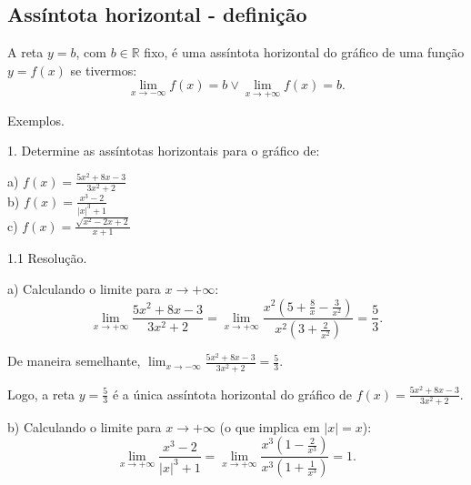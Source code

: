 \documentclass{article}
\begin{document}
{\begin{newpage}
\subsection{Assíntota horizontal - definição}
\par\hspace{12pt} A reta $y=b$, com $b\in\mathbb{R}$ fixo, é uma assíntota horizontal do gráfico de uma função $y=f(x)$ se tivermos:
$$\displaystyle{\lim_{x\to -\infty }} f(x) = b  \vee \displaystyle{\lim_{x\to +\infty }} f(x) = b .$$
\par
\vspace{0.3cm}
Exemplos.
\begin{flushleft}
1. Determine as assíntotas horizontais para o gráfico de:
\end{flushleft}
\par
\begin{multicols}{3}
\hspace{-15pt}a) $\displaystyle{f(x)=\frac{5x^2 + 8x - 3}{3x^2 + 2}}$\\
b) $\displaystyle{f(x)=\frac{x^3 -2}{|x|^3 + 1}}$\\
c) $\displaystyle{f(x)=\frac{\sqrt{x^2 - 2x + 2}}{x+1}}$
\end{multicols}
\par
\vspace{0.3cm}
\begin{flushleft}
1.1 Resolução.
\end{flushleft}
\par
a) Calculando o limite para $x\rightarrow +\infty $:
\begin{equation*} \displaystyle{\lim_{x\to +\infty }} \frac{5x^2 + 8x - 3}{3x^2 + 2} = \displaystyle{\lim_{x\to +\infty }} \frac{x^{2}(5 + \frac{8}{x} - \frac{3}{x^2})}{x^{2}(3 + \frac{2}{x^2})} = \frac{5}{3}. \end{equation*}
\par De maneira semelhante, $\displaystyle{\lim_{x\to -\infty } \frac{5x^2 + 8x - 3}{3x^2 + 2} = \frac{5}{3}}$.
\par Logo, a reta $\displaystyle{y=\frac{5}{3}}$ é a única assíntota horizontal do gráfico de $\displaystyle{f(x)= \frac{5x^2 + 8x - 3}{3x^2 + 2}}$.
\par
\vspace{0.3cm}
b) Calculando o limite para $x\rightarrow +\infty $ (o que implica em $|x|=x$):
\begin{equation*} \displaystyle{\lim_{x\to +\infty }} \frac{x^3 -2}{|x|^3 + 1} = \displaystyle{\lim_{x\to +\infty }} \frac{x^3(1 - \frac{2}{x^3})}{x^3(1 + \frac{1}{x^3})} = 1.\end{equation*}

\end{newpage}}
\end{document}

